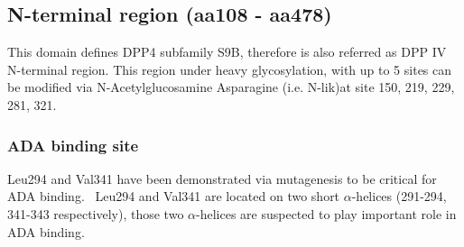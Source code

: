\subsection{N-terminal region (aa108 - aa478)}

This domain defines DPP4 subfamily S9B, therefore is also referred as DPP IV N-terminal region. This region under heavy glycosylation, with up to 5 sites can be modified via N-Acetylglucosamine Asparagine (i.e. N-lik)at site 150, 219, 229, 281, 321.    

\subsubsection{ADA binding site}
Leu294 and Val341 have been demonstrated via mutagenesis to be critical for ADA binding.~\cite{Abbott_1999} Leu294 and Val341 are located on two short $\alpha$-helices (291-294, 341-343 respectively), those two $\alpha$-helices are suspected to play important role in ADA binding. 